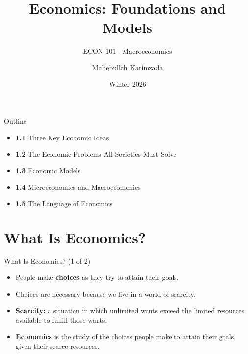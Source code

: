 \documentclass[aspectratio=169]{beamer}
\title{\textbf{Economics: Foundations and Models  \vspace{.5cm}\\  }}
\subtitle{ {\large ECON 101 - Macroeconomics}}
\author{Muhebullah Karimzada}
\date{Winter 2026}
\begin{document}
\begin{frame}[plain]
  \titlepage
\end{frame}
%
\begin{frame}{Outline}
\transfade
\begin{itemize}[<+->]
  \item \textbf{1.1} Three Key Economic Ideas
  \item \textbf{1.2} The Economic Problems All Societies Must Solve
  \item \textbf{1.3} Economic Models
  \item \textbf{1.4} Microeconomics and Macroeconomics
  \item \textbf{1.5} The Language of Economics
\end{itemize}
\end{frame}

\section{What Is Economics?}

\begin{frame}{What Is Economics? (1 of 2)}
\transfade
\begin{itemize}[<+->]
  \item People make \textbf{choices} as they try to attain their goals.
  \item Choices are necessary because we live in a world of \alert{scarcity}.
  \item \textbf{Scarcity:} a situation in which unlimited wants exceed the limited resources available to fulfill those wants.
  \item \textbf{Economics} is the study of the choices people make to attain their goals, given their scarce resources.
\end{itemize}
\end{frame}
\end{document}

